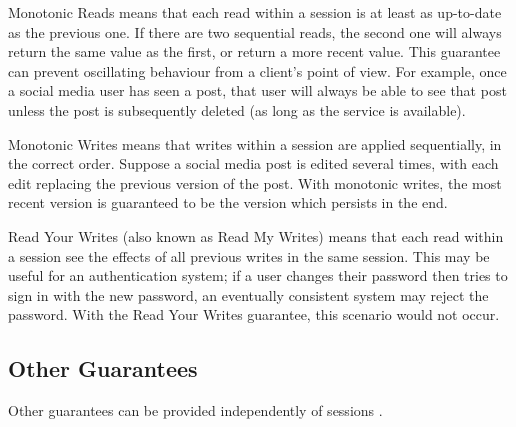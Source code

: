\documentclass[12pt,a4paper,twoside,openright]{report}
\begin{document}
\begin{description}
\item{Monotonic Reads} means that each read within a session is at least as up-to-date as the previous one. If there are two sequential reads, the second one will always return the same value as the first, or return a more recent value. This guarantee can prevent oscillating behaviour from a client's point of view. For example, once a social media user has seen a post, that user will always be able to see that post unless the post is subsequently deleted (as long as the service is available).

\item{Monotonic Writes} means that writes within a session are applied sequentially, in the correct order. Suppose a social media post is edited several times, with each edit replacing the previous version of the post. With monotonic writes, the most recent version is guaranteed to be the version which persists in the end.

\item{Read Your Writes} (also known as Read My Writes) means that each read within a session see the effects of all previous writes in the same session. This may be useful for an authentication system; if a user changes their password then tries to sign in with the new password, an eventually consistent system may reject the password. With the Read Your Writes guarantee, this scenario would not occur.

\end{description}

\subsection*{Other Guarantees}

Other guarantees can be provided independently of sessions \cite{terry2013}.
\end{document}
